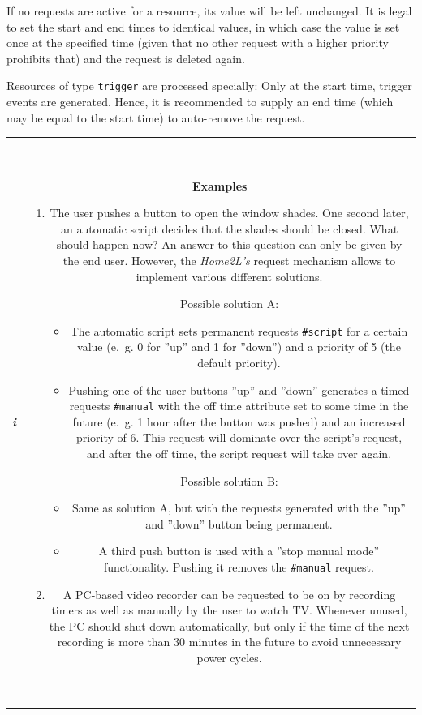 \documentclass[12pt,english,parskip=half]{scrreprt}
\newcommand{\infobox}[1]{
  \hfill
  \setlength\arrayrulewidth{1pt}
  \begin{tabular}[t]{c|c|}
    \parbox{1.8em}{\hfill\textit{\Huge\textbf{i}\,}}
    &
    \,\parbox{0.89\linewidth}{\setlength{\parskip}{0.5em}#1}\,
  \end{tabular}
  \par
}
\begin{document}
If no requests are active for a resource, its value will be left
unchanged. It is legal to set the start and end times to identical
values, in which case the value is set once at the specified time (given
that no other request with a higher priority prohibits that) and the
request is deleted again.

Resources of type \texttt{trigger} are processed specially: Only at
the start time, trigger events are generated. Hence, it is
recommended to supply an end time (which may be equal to the start time)
to auto-remove the request.


\infobox{
  \textbf{Examples}

  \begin{enumerate}

  \item
    The user pushes a button to open the window shades. One second later,
    an automatic script decides that the shades should be closed. What should happen now?
    An answer to this question can only be given by the end user. However, the
    \emph{Home2L's} request mechanism allows to implement various different
    solutions.

    Possible solution A:
    \begin{itemize}
      \item The automatic script sets permanent requests \texttt{\#script}
        for a certain value (e.~g.
        0 for ''up'' and 1 for ''down'') and a priority of 5 (the default priority).
      \item Pushing one of the user buttons ''up'' and ''down'' generates a timed requests
        \texttt{\#manual} with the off time attribute set to some time in the future
        (e.~g. 1 hour after the button was pushed)
        and an increased priority of 6. This request will dominate over the script's
        request, and after the off time, the script request will take over again.
    \end{itemize}

    Possible solution B:
    \begin{itemize}
      \item Same as solution A, but with the requests generated with the ''up'' and
        ''down'' button being permanent.
      \item A third push button is used with a ''stop manual mode'' functionality.
        Pushing it removes the \texttt{\#manual} request.
    \end{itemize}

  \item
    A PC-based video recorder can be requested to be on by recording timers as well as
    manually by the user to watch TV. Whenever unused, the PC should shut
    down automatically, but only if the time of the next recording is more
    than 30 minutes in the future to avoid unnecessary power cycles.


\end{enumerate}}
\end{document}
